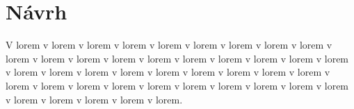 
\chapter{Návrh}\label{ch:návrh}

V lorem v lorem v lorem v lorem v lorem v lorem v lorem v lorem v lorem v lorem v lorem v lorem v lorem v lorem v lorem v lorem v lorem v lorem v lorem v lorem v lorem v lorem v lorem v lorem v lorem v lorem v lorem v lorem v lorem v lorem v lorem v lorem v lorem v lorem v lorem v lorem v lorem v lorem v lorem v lorem v lorem v lorem v lorem.